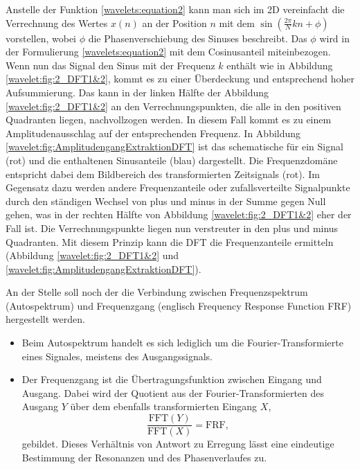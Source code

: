 Anstelle der Funktion \eqref{wavelets:equation2} kann man sich im
2D vereinfacht die Verrechnung des Wertes $x(n)$ an der Position
$n$ mit dem $\sin(\frac{2\pi}{N}kn+\phi)$ vorstellen, wobei $\phi$
die Phasenverschiebung des Sinuses beschreibt.
Das $\phi$  wird in der Formulierung \eqref{wavelets:equation2} mit
dem Cosinusanteil miteinbezogen.
Wenn nun das Signal den Sinus mit der Frequenz $k$ enthält wie in
Abbildung \ref{wavelet:fig:2_DFT1&2}, kommt es zu einer Überdeckung
und entsprechend hoher Aufsummierung.
Das kann in der linken Hälfte der Abbildung \ref{wavelet:fig:2_DFT1&2}
an den Verrechnungspunkten, die alle in den positiven Quadranten
liegen, nachvollzogen werden.
In diesem Fall kommt es zu einem Amplitudenausschlag auf der
entsprechenden Frequenz.
In Abbildung \ref{wavelet:fig:AmplitudengangExtraktionDFT} ist das
schematische für ein Signal (rot) und die enthaltenen Sinusanteile
(blau) dargestellt.
Die Frequenzdomäne entspricht dabei dem Bildbereich des transformierten
Zeitsignals (rot).
Im Gegensatz dazu werden andere Frequenzanteile oder zufallsverteilte
Signalpunkte durch den ständigen Wechsel von plus und minus in der
Summe gegen Null gehen, was in der rechten Hälfte von Abbildung
\ref{wavelet:fig:2_DFT1&2} eher der Fall ist.
Die Verrechnungspunkte liegen nun verstreuter in den plus und minus
Quadranten.
Mit diesem Prinzip kann die DFT die Frequenzanteile ermitteln
(Abbildung \ref{wavelet:fig:2_DFT1&2} und
\ref{wavelet:fig:AmplitudengangExtraktionDFT}).

An der Stelle soll noch der die Verbindung zwischen Frequenzspektrum
(Autospektrum) und Frequenzgang (englisch Frequency Response Function
FRF) hergestellt werden.

\begin{itemize}
	\item Beim Autospektrum handelt es sich lediglich um die
	Fourier-Transformierte eines Signales, meistens des
	Ausgangssignals.
	\item Der Frequenzgang ist die Übertragungsfunktion zwischen
	Eingang und Ausgang.
	Dabei wird der Quotient aus der
	Fourier-Transformierten des Ausgang $Y$ über dem ebenfalls
	transformierten Eingang $X$,
	\[
	\frac{\text{FFT}(Y)}{\text{FFT}(X)} = \text{FRF},
	\]
	gebildet.
	Dieses Verhältnis von Antwort zu Erregung lässt eine
	eindeutige Bestimmung der Resonanzen und des Phasenverlaufes
	zu.
\end{itemize}


